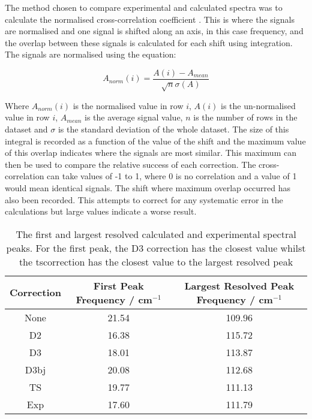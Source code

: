 The method chosen to compare experimental and calculated spectra was to calculate the normalised cross\nobreakdash-correlation coefficient \DIFdelbegin \DIFdel{~}\DIFdelend \cite{Kendrick2020}. This is where the signals are normalised and one signal is shifted along an axis, in this case frequency, and the overlap between these signals is calculated for each shift using integration. The signals are normalised using the equation:

\begin{equation}
A_{norm}(i) = \frac{A(i) - A_{mean}}{\sqrt{n}\sigma(A)}
\end{equation}

Where \(A_{norm}(i)\) is the normalised value in row \(i\), \(A(i)\) is the un\nobreakdash-normalised value in row \(i\), \(A_{mean}\) is the average signal value, \(n\) is the number of rows in the dataset and \(\sigma\) is the standard deviation of the whole dataset. The size of this integral is recorded as a function of the value of the shift and the maximum value of this overlap indicates where the signals are most similar. This maximum can then be used to compare the relative success of each correction. The cross\nobreakdash-correlation can take values of -1 to 1, where 0 is no correlation and a value of 1 would mean identical signals. The shift where maximum overlap occurred has also been recorded. This attempts to correct for any systematic error in the calculations but large values indicate a worse result.

\begin{table}
\centering
\begin{tabular}{@{}ccc@{}}
\toprule
Correction            & First Peak Frequency / cm${^{-1}}$           & Largest Resolved Peak Frequency / cm${^{-1}}$      \\ \midrule
None &
  21.54 &
  109.96 \\
D2 &
  16.38 &
  115.72 \\
D3 &
 18.01 & 
 113.87 \\
D3\acrshort{bj} &
  20.08 &
  112.68 \\
TS &
  19.77 &
  111.13 \\
Exp &
  17.60 &
  111.79 \\ \bottomrule
\end{tabular}
\captionsetup{font = footnotesize, justification = centering}
\caption[The First and Largest Resolved Calculated and Experimental Spectral Peaks]{The first and largest resolved calculated and experimental spectral peaks. For the first peak, the D3 correction has the closest value whilst the \acrshort{ts}correction has the closest value to the largest resolved peak}
\label{tab:calc_exp_peaks}
\end{table}

